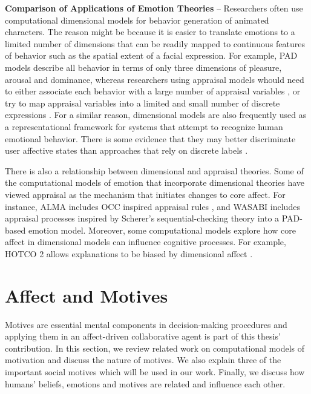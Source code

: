 \documentclass[12pt]{report}
\begin{document}
\textbf{Comparison of Applications of Emotion Theories} -- Researchers often use
computational dimensional models for behavior generation of animated characters.
The reason might be because it is easier to translate emotions to a limited
number of dimensions that can be readily mapped to continuous features of
behavior such as the spatial extent of a facial expression. For example, PAD
models describe all behavior in terms of only three dimensions of pleasure,
arousal and dominance, whereas researchers using appraisal models whould need to
either associate each behavior with a large number of appraisal variables
\cite{scherer:expression-appraisal}
\cite{smith:computational-facial-expression}, or try to map appraisal variables
into a limited and small number of discrete expressions
\cite{elliott:affective-reasoner}. For a similar reason, dimensional models are
also frequently used as a representational framework for systems that attempt to
recognize human emotional behavior. There is some evidence that they may better
discriminate user affective states than approaches that rely on discrete labels
\cite{barrett:emotions-natural}.

There is also a relationship between dimensional and appraisal theories. Some of
the computational models of emotion that incorporate dimensional theories have
viewed appraisal as the mechanism that initiates changes to core affect. For
instance, ALMA \cite{gebhard:alma} includes OCC inspired appraisal rules
\cite{occ:structure}, and WASABI \cite{becker:wasabi} includes appraisal
processes inspired by Scherer's sequential-checking theory into a PAD-based
emotion model. Moreover, some computational models explore how core affect in
dimensional models can influence cognitive processes. For example, HOTCO 2
\cite{thagard:emotional-coherence} allows explanations to be biased by
dimensional affect \cite{marsella:computational-models}.

\section{Affect and Motives}
\label{sec:affect-motives}
Motives are essential mental components in decision-making procedures and
applying them in an affect-driven collaborative agent is part of this thesis'
contribution. In this section, we review related work on computational models
of motivation and discuss the nature of motives. We also explain three of the
important social motives which will be used in our work. Finally, we discuss
how humans' beliefs, emotions and motives are related and influence each other. 
\end{document}
